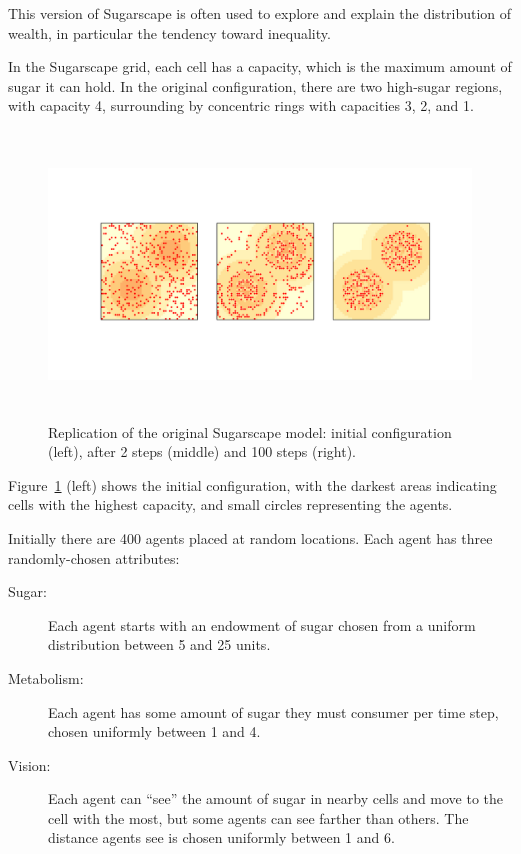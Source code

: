 \documentclass[12pt]{book}
\theoremstyle{exercise}
\begin{document}
This version of Sugarscape is often used to explore and explain the
distribution of wealth, in particular the tendency toward inequality.

In the Sugarscape grid, each cell has a capacity, which is the maximum
amount of sugar it can hold.  In the original configuration, there
are two high-sugar regions, with capacity 4, surrounding by concentric
rings with capacities 3, 2, and 1.

\begin{figure}
\centerline{\includegraphics[height=3in]{figs/chap09-3.pdf}}
\caption{Replication of the original Sugarscape model: initial
configuration (left), after 2 steps (middle) and 100 steps (right).}
\label{chap09-3}
\end{figure}

Figure~\ref{chap09-3} (left) shows the initial configuration, with the darkest
areas indicating cells with the highest capacity, and small circles
representing the agents.

Initially there are 400 agents placed at random locations.  Each
agent has three randomly-chosen attributes:

\begin{description}

\item[Sugar:] Each agent starts with an endowment of sugar chosen
from a uniform distribution between 5 and 25 units.

\item[Metabolism:] Each agent has some amount of sugar they must
consumer per time step, chosen uniformly between 1 and 4.

\item[Vision:] Each agent can ``see'' the amount
of sugar in nearby cells and move to the cell with the most, but
some agents can see farther than others.  The distance agents
see is chosen uniformly between 1 and 6.

\end{description}
\end{document}
